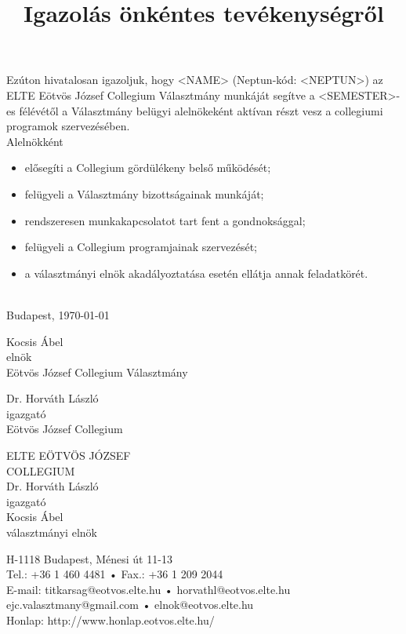 \documentclass[12pt,a4paper]{article}
\title{Igazolás önkéntes tevékenységről\vspace{-1.0cm}}
\date{}
\author{}
\makeatletter
\newcommand\Footer{
	{\footnotesize 
	\begin{minipage}[t]{0.4\textwidth}
		\begin{flushright}
			ELTE EÖTVÖS JÓZSEF\\
			COLLEGIUM\\
			Dr. Horváth László\\
			igazgató\\
			Kocsis Ábel\\
			választmányi elnök
		\end{flushright}
	\end{minipage}
	\hspace{1em}
	\begin{minipage}[t]{0.45\textwidth}
		\begin{flushleft}
			H-1118 Budapest, Ménesi út 11-13\\
			Tel.: +36 1 460 4481 • Fax.: +36 1 209 2044\\
			E-mail:	titkarsag@eotvos.elte.hu • horvathl@eotvos.elte.hu
			ejc.valasztmany@gmail.com • elnok@eotvos.elte.hu\\
			Honlap: http://www.honlap.eotvos.elte.hu/
		\end{flushleft}
	\end{minipage}
	}
}
\newcommand{\signiture}[3]{
\begin{center}
	#1\\
	#2\\
	#3
\end{center}
}
\makeatother
\begin{document}
\maketitle

Ezúton hivatalosan igazoljuk, hogy <NAME> (Neptun-kód: <NEPTUN>) az ELTE Eötvös József Collegium Választmány munkáját segítve a <SEMESTER>-es félévétől a Választmány belügyi alelnökeként aktívan részt vesz a collegiumi programok szervezésében.\\
\leavevmode\smallskip
Alelnökként
\begin{itemize}
	\itemsep0em 
	\item elősegíti a Collegium gördülékeny belső működését;
	\item felügyeli a Választmány bizottságainak munkáját;
	\item rendszeresen munkakapcsolatot tart fent a gondnoksággal;
	\item felügyeli a Collegium programjainak szervezését;
	\item a választmányi elnök akadályoztatása esetén ellátja annak feladatkörét.
\end{itemize}


\leavevmode\\
Budapest, \today
\vspace{5em}

\begin{flushright}
	\begin{minipage}[t]{0.4\textwidth}
		\signiture{Kocsis Ábel}{elnök}{Eötvös József Collegium Választmány}
	\end{minipage}
\end{flushright}

\vspace{5em}

\begin{flushright}
\begin{minipage}[t]{0.4\textwidth}
	\signiture{Dr. Horváth László}{igazgató}{Eötvös József Collegium}
\end{minipage}
\end{flushright}

\vfill

\begin{center}
	\Footer
\end{center}
\end{document}
